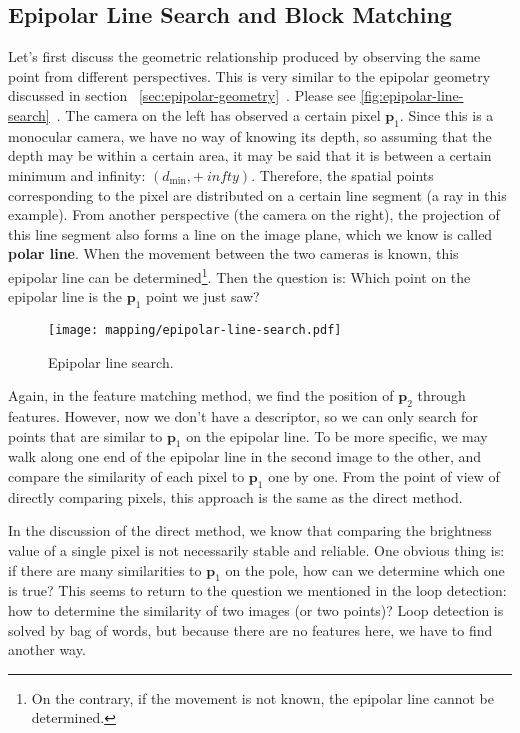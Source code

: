 \subsection{Epipolar Line Search and Block Matching}
Let's first discuss the geometric relationship produced by observing the same point from different perspectives. This is very similar to the epipolar geometry discussed in section ~\ref{sec:epipolar-geometry}~. Please see \autoref{fig:epipolar-line-search}~. The camera on the left has observed a certain pixel $\bm{p}_1$. Since this is a monocular camera, we have no way of knowing its depth, so assuming that the depth may be within a certain area, it may be said that it is between a certain minimum and infinity: $(d_\mathrm{min}, +\ infty)$. Therefore, the spatial points corresponding to the pixel are distributed on a certain line segment (a ray in this example). From another perspective (the camera on the right), the projection of this line segment also forms a line on the image plane, which we know is called \textbf{polar line}. When the movement between the two cameras is known, this epipolar line can be determined\footnote{On the contrary, if the movement is not known, the epipolar line cannot be determined. }. Then the question is: Which point on the epipolar line is the $\bm{p}_1$ point we just saw?

\begin{figure}[!htp]
	\centering
	\texttt{[image: mapping/epipolar-line-search.pdf]}
	\caption{Epipolar line search.}
	\label{fig:epipolar-line-search}
\end{figure}

Again, in the feature matching method, we find the position of $\bm{p}_2$ through features. However, now we don’t have a descriptor, so we can only search for points that are similar to $\bm{p}_1$ on the epipolar line. To be more specific, we may walk along one end of the epipolar line in the second image to the other, and compare the similarity of each pixel to $\bm{p}_1$ one by one. From the point of view of directly comparing pixels, this approach is the same as the direct method.

In the discussion of the direct method, we know that comparing the brightness value of a single pixel is not necessarily stable and reliable. One obvious thing is: if there are many similarities to $\bm{p}_1$ on the pole, how can we determine which one is true? This seems to return to the question we mentioned in the loop detection: how to determine the similarity of two images (or two points)? Loop detection is solved by bag of words, but because there are no features here, we have to find another way.

